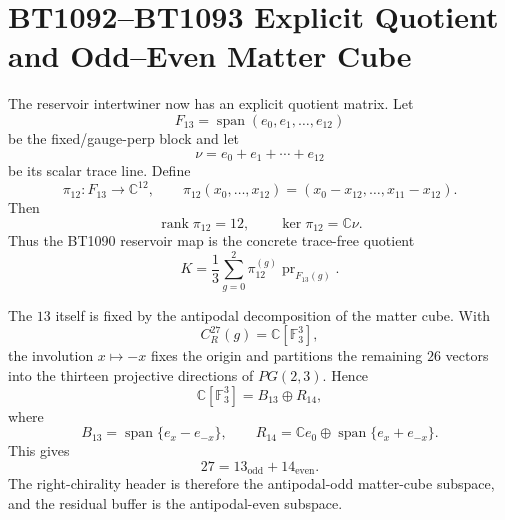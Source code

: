 \section{BT1092--BT1093 Explicit Quotient and Odd--Even Matter Cube}
\label{sec:bt1092-bt1093-explicit-quotient-cube}

The reservoir intertwiner now has an explicit quotient matrix.  Let
\[
F_{13}=\operatorname{span}(e_0,e_1,\ldots,e_{12})
\]
be the fixed/gauge-perp block and let
\[
\nu=e_0+e_1+\cdots+e_{12}
\]
be its scalar trace line.  Define
\[
\pi_{12}:F_{13}\to\mathbb C^{12},
\qquad
\pi_{12}(x_0,\ldots,x_{12})=(x_0-x_{12},\ldots,x_{11}-x_{12}).
\]
Then
\[
\operatorname{rank}\pi_{12}=12,
\qquad
\ker\pi_{12}=\mathbb C\nu.
\]
Thus the BT1090 reservoir map is the concrete trace-free quotient
\[
K=\frac13\sum_{g=0}^{2}\pi_{12}^{(g)}\operatorname{pr}_{F_{13}(g)}.
\]

The $13$ itself is fixed by the antipodal decomposition of the matter cube.  With
\[
C^{27}_R(g)=\mathbb C[\mathbb F_3^3],
\]
the involution $x\mapsto -x$ fixes the origin and partitions the remaining $26$ vectors into the thirteen projective directions of $PG(2,3)$.  Hence
\[
\mathbb C[\mathbb F_3^3]
= B_{13}\oplus R_{14},
\]
where
\[
B_{13}=\operatorname{span}\{e_x-e_{-x}\},
\qquad
R_{14}=\mathbb C e_0\oplus\operatorname{span}\{e_x+e_{-x}\}.
\]
This gives
\[
27=13_{\mathrm{odd}}+14_{\mathrm{even}}.
\]
The right-chirality header is therefore the antipodal-odd matter-cube subspace, and the residual buffer is the antipodal-even subspace.
